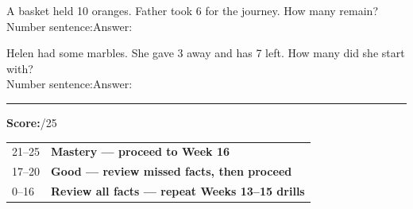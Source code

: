 \documentclass[12pt, letterpaper]{article}
\begin{document}
\medskip
\prob A basket held 10 oranges. Father took 6 for the journey. How many remain?\\[6pt]
\hspace{2em}Number sentence:\ansblanklg \quad Answer:\ansblank

\medskip
\prob Helen had some marbles. She gave 3 away and has 7 left. How many did she start with?\\[6pt]
\hspace{2em}Number sentence:\ansblanklg \quad Answer:\ansblank

\bigskip
{\color{sd-gold}\rule{\linewidth}{0.5pt}}

\begin{instructbox}
\textbf{Score:}\underline{\hspace{1.5cm}}/25\hfill
\begin{tabular}{@{}ll@{}}
21--25 & \textbf{\color{sd-green}Mastery — proceed to Week 16}\\
17--20 & \textbf{\color{sd-gold}Good — review missed facts, then proceed}\\
0--16  & \textbf{\color{red!70!black}Review all facts — repeat Weeks 13--15 drills}
\end{tabular}
\end{instructbox}
\end{document}
